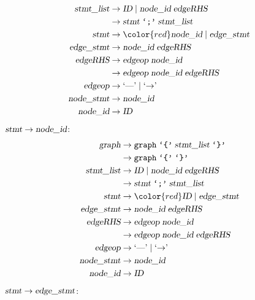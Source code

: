 \begin{loesung}
\begin{teilaufgaben}
\begin{align*}
\textsl{stmt\_list}&\rightarrow \textsl{ID}\; |\;
                                \textsl{node\_id}\; \textsl{edgeRHS} \\
                   &\rightarrow \textsl{stmt}\; \texttt{`;'}\; \textsl{stmt\_list}\\
\textsl{stmt}      &\rightarrow {\color{red}\textsl{node\_id}}\; |\;
                                \textsl{edge\_stmt} \\
\textsl{edge\_stmt}&\rightarrow \textsl{node\_id}\; \textsl{edgeRHS} \\
\textsl{edgeRHS}   &\rightarrow \textsl{edgeop}\; \textsl{node\_id}\\
                   &\rightarrow \textsl{edgeop}\; \textsl{node\_id}\; \textsl{edgeRHS}\\
\textsl{edgeop}    &\rightarrow \textrm{`\text{---}'}\; |\; \textrm{`$\rightarrow$'}\; \\
\textsl{node\_stmt}&\rightarrow \textsl{node\_id} \\
\textsl{node\_id}  &\rightarrow \textsl{ID}
\end{align*}
$\textsl{stmt}\to\textsl{node\_id}$:
\begin{align*}
\textsl{graph}     &\rightarrow \texttt{graph}\; \texttt{`\{'}\; \textsl{stmt\_list}\; \texttt{`\}'} \\
                   &\rightarrow \texttt{graph}\; \texttt{`\{'}\; \texttt{`\}'} \\
\textsl{stmt\_list}&\rightarrow \textsl{ID}\; |\;
                                \textsl{node\_id}\; \textsl{edgeRHS} \\
                   &\rightarrow \textsl{stmt}\; \texttt{`;'}\; \textsl{stmt\_list}\\
\textsl{stmt}      &\rightarrow {\color{red}\textsl{ID}}\; |\;
                                \textsl{edge\_stmt} \\
\textsl{edge\_stmt}&\rightarrow \textsl{node\_id}\; \textsl{edgeRHS} \\
\textsl{edgeRHS}   &\rightarrow \textsl{edgeop}\; \textsl{node\_id}\\
                   &\rightarrow \textsl{edgeop}\; \textsl{node\_id}\; \textsl{edgeRHS}\\
\textsl{edgeop}    &\rightarrow \textrm{`\text{---}'}\; |\; \textrm{`$\rightarrow$'}\; \\
\textsl{node\_stmt}&\rightarrow \textsl{node\_id} \\
\textsl{node\_id}  &\rightarrow \textsl{ID}
\end{align*}
$\textsl{stmt}\to\textsl{edge\_stmt}$:

\end{teilaufgaben}
\end{loesung}
